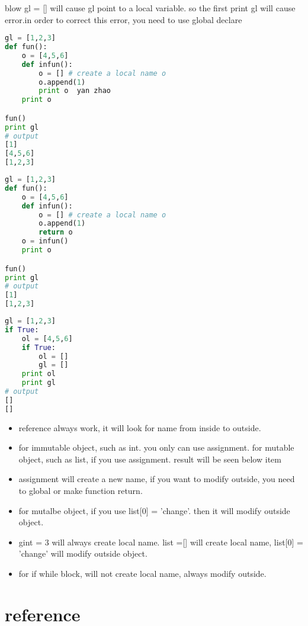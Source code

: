 \documentclass[a4paper,12pt,twoside]{book}
\begin{document}
blow gl = [] will cause gl point to a local variable. so the first print gl will cause error.in order to correct this error, you need to use global declare

\begin{lstlisting}[frame=single, language=python]
gl = [1,2,3]
def fun():
	o = [4,5,6]
	def infun():
		o = [] # create a local name o
		o.append(1)
		print o  yan zhao
	print o

fun()
print gl
# output 
[1]
[4,5,6]
[1,2,3]
\end{lstlisting}  

\begin{lstlisting}[frame=single, language=python]
gl = [1,2,3]
def fun():
	o = [4,5,6]
	def infun():
		o = [] # create a local name o
		o.append(1)
		return o
	o = infun()
	print o

fun()
print gl
# output 
[1]
[1,2,3]
\end{lstlisting}  


\begin{lstlisting}[frame=single, language=python]
gl = [1,2,3]
if True:
	ol = [4,5,6]
	if True:
		ol = []
		gl = []
	print ol
	print gl
# output 
[]
[]
\end{lstlisting}  





\begin{itemize}
		\item reference always work, it will look for name from inside to outside.
		\item for immutable object, such as int. you only can use assignment. for mutable object, such as list, if you use assignment. result will be seen below item
		\item assignment will create a new name, if you want to modify outside, you need to global or make function return.
		\item for mutalbe object, if you use list[0] = 'change'. then it will modify outside object.
		\item gint = 3 will always create local name. list =[] will create local name, list[0] = 'change' will modify outside object.
		\item for if while block, will not create local name, always modify outside. 
\end{itemize}

\section{reference}
\end{document}
